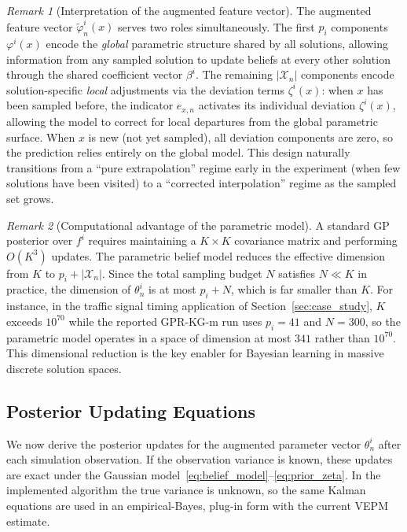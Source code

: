 \documentclass[12pt]{article}
\theoremstyle{plain}
\theoremstyle{definition}
\theoremstyle{remark}
\newtheorem{remark}{Remark}[section]
\begin{document}
\begin{remark}[Interpretation of the augmented feature vector]\label{rem:augmented_phi}
The augmented feature vector $\tilde{\varphi}^i_n(x)$ serves two roles simultaneously.  The first $p_i$ components $\varphi^i(x)$ encode the \emph{global} parametric structure shared by all solutions, allowing information from any sampled solution to update beliefs at every other solution through the shared coefficient vector $\beta^i$.  The remaining $|\mathcal{X}_n|$ components encode solution-specific \emph{local} adjustments via the deviation terms $\zeta^i(x)$: when $x$ has been sampled before, the indicator $e_{x,n}$ activates its individual deviation $\zeta^i(x)$, allowing the model to correct for local departures from the global parametric surface.  When $x$ is new (not yet sampled), all deviation components are zero, so the prediction relies entirely on the global model.  This design naturally transitions from a ``pure extrapolation'' regime early in the experiment (when few solutions have been visited) to a ``corrected interpolation'' regime as the sampled set grows.
\end{remark}

\begin{remark}[Computational advantage of the parametric model]\label{rem:dim_reduction}
A standard GP posterior over $f^i$ requires maintaining a $K \times K$ covariance matrix and performing $O(K^3)$ updates. The parametric belief model reduces the effective dimension from $K$ to $p_i + |\mathcal{X}_n|$. Since the total sampling budget $N$ satisfies $N \ll K$ in practice, the dimension of $\theta^i_n$ is at most $p_i + N$, which is far smaller than $K$. For instance, in the traffic signal timing application of Section~\ref{sec:case_study}, $K$ exceeds $10^{70}$ while the reported GPR-KG-m run uses $p_i = 41$ and $N=300$, so the parametric model operates in a space of dimension at most $341$ rather than $10^{70}$. This dimensional reduction is the key enabler for Bayesian learning in massive discrete solution spaces.
\end{remark}


\subsection{Posterior Updating Equations}\label{subsec:posterior}

We now derive the posterior updates for the augmented parameter vector $\theta^i_n$ after each simulation observation. If the observation variance is known, these updates are exact under the Gaussian model~\eqref{eq:belief_model}--\eqref{eq:prior_zeta}. In the implemented algorithm the true variance is unknown, so the same Kalman equations are used in an empirical-Bayes, plug-in form with the current VEPM estimate.
\end{document}
